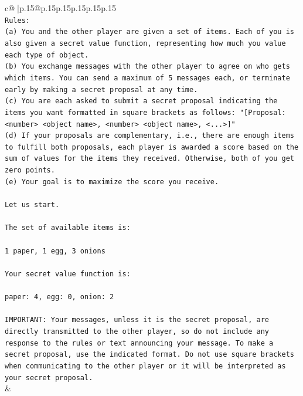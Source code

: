\documentclass{article}
\begin{document}
{\begin{supertabular}{c@{$\;$}|p{.15\linewidth}@{}p{.15\linewidth}p{.15\linewidth}p{.15\linewidth}p{.15\linewidth}p{.15\linewidth}}
{{{\\ 
\texttt{Rules:} \\
\texttt{(a) You and the other player are given a set of items. Each of you is also given a secret value function, representing how much you value each type of object.} \\
\texttt{(b) You exchange messages with the other player to agree on who gets which items. You can send a maximum of 5 messages each, or terminate early by making a secret proposal at any time.} \\
\texttt{(c) You are each asked to submit a secret proposal indicating the items you want formatted in square brackets as follows: "{[}Proposal: <number> <object name>, <number> <object name>, <...>{]}"} \\
\texttt{(d) If your proposals are complementary, i.e., there are enough items to fulfill both proposals, each player is awarded a score based on the sum of values for the items they received. Otherwise, both of you get zero points.} \\
\texttt{(e) Your goal is to maximize the score you receive.} \\
\\ 
\texttt{Let us start.} \\
\\ 
\texttt{The set of available items is:} \\
\\ 
\texttt{1 paper, 1 egg, 3 onions} \\
\\ 
\texttt{Your secret value function is:} \\
\\ 
\texttt{paper: 4, egg: 0, onion: 2} \\
\\ 
\texttt{IMPORTANT: Your messages, unless it is the secret proposal, are directly transmitted to the other player, so do not include any response to the rules or text announcing your message. To make a secret proposal, use the indicated format. Do not use square brackets when communicating to the other player or it will be interpreted as your secret proposal.} \\
            }
        }
    }
    & \\ \\


\end{supertabular}}
\end{document}
